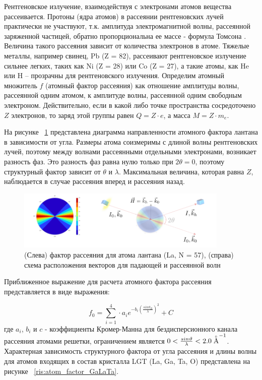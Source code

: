 
Рентгеновское излучение, взаимодействуя с электронами атомов вещества рассеивается.
Протоны (ядра атомов) в рассеянии рентгеновских лучей практически не участвуют, т.к.
амплитуда электромагнитной волны, рассеянной заряженной частицей,
 обратно пропорциональна ее массе - формула Томсона \cite{iveronova1972}. Величина такого рассеяния
 зависит от количества электронов в атоме.  Тяжелые металлы,
 например свинец, Pb (Z = 82), рассеивают рентгеновское излучение сильнее легких,
 таких как Ni (Z = 28) или  Co (Z = 27), а такие атомы, как He или H – прозрачны
 для рентгеновского излучения. Определим атомный множитель $f$ (атомный фактор рассеяния)
как отношение амплитуды волны, рассеянной одним атомом, к амплитуде волны, рассеянной
одним свободным электроном. Действительно, если в какой либо точке пространства сосредоточено
$Z$ электронов, то заряд этой группы равен $Q = Z\cdot e$, а масса $M = Z \cdot m_e$.

На рисунке ~\ref{ris:atom_factor} представлена диаграмма направленности атомного
фактора лантана в зависимости от угла. Размеры атома соизмеримы с длиной волны
рентгеновских лучей, поэтому между волнами рассеянными отдельными электронами, возникает
разность фаз. Это разность фаз равна нулю только при $2 \theta = 0$, поэтому структурный
фактор зависит от $\theta$ и $\lambda$. Максимальная величина, которая равна $Z$,
 наблюдается в случае рассеяния вперед и рассеяния назад.

\begin{figure}[H]
  \centering
  \includegraphics[width=0.9\textwidth]{images/atom_factor.png}
  \caption{ (Слева) фактор рассеяния для атома лантана (La, N = 57), (справа)
  схема расположения векторов для падающей и рассеянной волн}
  \label{ris:atom_factor}
\end{figure}

Приближенное выражение для расчета атомного фактора рассеяния
представляется \cite{International_Tables} в виде выражения:

\begin{equation}
  f_0 = \sum_{i=1}^{4} \cdot a_i e^{ -b_i (\frac{sin \vartheta_B}{\lambda})^2} + C
 \end{equation}
где $a_i$, $b_i$ и $c$ - коэффициенты Кромер-Манна для бездисперсионного канала рассеяния атомами решетки,
ограничением является $0<\frac{sin\vartheta}{\lambda}<2.0 \angstrom ^{-1}$.
 Характерная зависимость структурного фактора от угла рассеяния и длины волны
для атомов входящих в состав кристалла LGT (La, Ga, Ta, O) представлена на рисунке ~\ref{ris:atom_factor_GaLaTa}.

